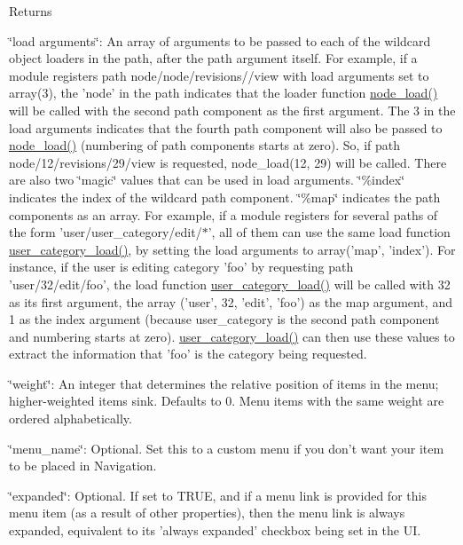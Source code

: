 \begin{DoxyReturn}{Returns}
\begin{DoxyItemize}
\item \char`\"{}load arguments\char`\"{}: An array of arguments to be passed to each of the wildcard object loaders in the path, after the path argument itself. For example, if a module registers path node/node/revisions//view with load arguments set to array(3), the 'node' in the path indicates that the loader function \hyperlink{node_8module_a492ddfc12843e71242bb484a44e51a19}{node\_\-load()} will be called with the second path component as the first argument. The 3 in the load arguments indicates that the fourth path component will also be passed to \hyperlink{node_8module_a492ddfc12843e71242bb484a44e51a19}{node\_\-load()} (numbering of path components starts at zero). So, if path node/12/revisions/29/view is requested, node\_\-load(12, 29) will be called. There are also two \char`\"{}magic\char`\"{} values that can be used in load arguments. \char`\"{}\%index\char`\"{} indicates the index of the wildcard path component. \char`\"{}\%map\char`\"{} indicates the path components as an array. For example, if a module registers for several paths of the form 'user/user\_\-category/edit/$\ast$', all of them can use the same load function \hyperlink{user_8module_ad5ee67e73aa6eba6ce29186eea51e6d5}{user\_\-category\_\-load()}, by setting the load arguments to array('map', 'index'). For instance, if the user is editing category 'foo' by requesting path 'user/32/edit/foo', the load function \hyperlink{user_8module_ad5ee67e73aa6eba6ce29186eea51e6d5}{user\_\-category\_\-load()} will be called with 32 as its first argument, the array ('user', 32, 'edit', 'foo') as the map argument, and 1 as the index argument (because user\_\-category is the second path component and numbering starts at zero). \hyperlink{user_8module_ad5ee67e73aa6eba6ce29186eea51e6d5}{user\_\-category\_\-load()} can then use these values to extract the information that 'foo' is the category being requested.
\item \char`\"{}weight\char`\"{}: An integer that determines the relative position of items in the menu; higher-\/weighted items sink. Defaults to 0. Menu items with the same weight are ordered alphabetically.
\item \char`\"{}menu\_\-name\char`\"{}: Optional. Set this to a custom menu if you don't want your item to be placed in Navigation.
\item \char`\"{}expanded\char`\"{}: Optional. If set to TRUE, and if a menu link is provided for this menu item (as a result of other properties), then the menu link is always expanded, equivalent to its 'always expanded' checkbox being set in the UI.

\end{DoxyItemize}
\end{DoxyReturn}
